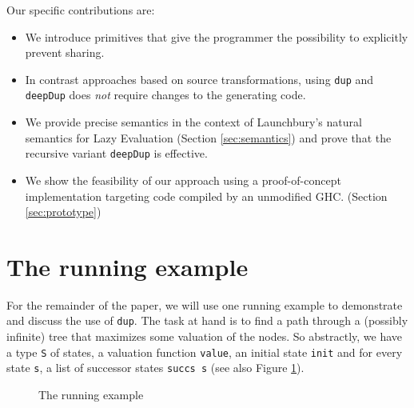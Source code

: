 \documentclass[preprint]{sigplanconf}
\theoremstyle{nonumberplain}
\newcommand{\li}{\lstinline[style=Haskell]}
\begin{document}
Our specific contributions are:
\begin{itemize}
\item We introduce primitives that give the programmer the possibility to explicitly prevent sharing.
\item In contrast approaches based on source transformations, using \li-dup- and \li-deepDup- does \emph{not} require changes to the generating code.
\item We provide precise semantics in the context of Launchbury’s natural semantics for Lazy Evaluation (Section \ref{sec:semantics}) and prove that the recursive variant \li-deepDup- is effective.
\item We show the feasibility of our approach using a proof-of-concept implementation targeting code compiled by an unmodified GHC. (Section \ref{sec:prototype})
\end{itemize}

\pagebreak[3]
\section{The running example}
\label{sec:example}

For the remainder of the paper, we will use one running example to demonstrate and discuss the use of \li-dup-. The task at hand is to find a path through a (possibly infinite) tree that maximizes some valuation of the nodes. So abstractly, we have a type \li-S- of states, a valuation function \li-value-, an initial state \li-init- and for every state \li-s-, a list of successor states \li-succs s- (see also Figure \ref{fig:ex}).

\begin{figure}
\caption{The running example}
\label{fig:ex}
\end{figure}
\end{document}
